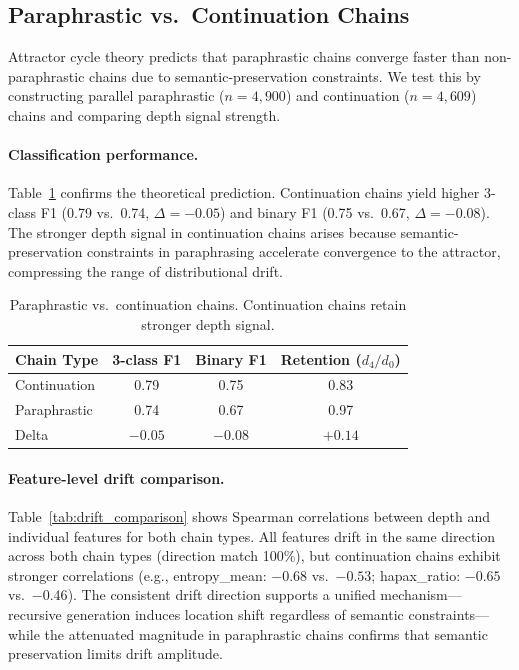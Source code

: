 \documentclass[11pt,a4paper]{article}
\begin{document}
\subsection{Paraphrastic vs.\ Continuation Chains}
\label{sec:para}

Attractor cycle theory predicts that paraphrastic chains converge faster than non-paraphrastic chains due to semantic-preservation constraints. We test this by constructing parallel paraphrastic ($n = 4{,}900$) and continuation ($n = 4{,}609$) chains and comparing depth signal strength.

\paragraph{Classification performance.} Table~\ref{tab:para_cont} confirms the theoretical prediction. Continuation chains yield higher 3-class F1 (0.79 vs.\ 0.74, $\Delta = -0.05$) and binary F1 (0.75 vs.\ 0.67, $\Delta = -0.08$). The stronger depth signal in continuation chains arises because semantic-preservation constraints in paraphrasing accelerate convergence to the attractor, compressing the range of distributional drift.

\begin{table}[t]
\centering
\caption{Paraphrastic vs.\ continuation chains. Continuation chains retain stronger depth signal.}
\label{tab:para_cont}
\begin{tabular}{lccc}
\toprule
Chain Type & 3-class F1 & Binary F1 & Retention ($d_4/d_0$) \\
\midrule
Continuation & 0.79 & 0.75 & 0.83 \\
Paraphrastic & 0.74 & 0.67 & 0.97 \\
\midrule
Delta & $-0.05$ & $-0.08$ & $+0.14$ \\
\bottomrule
\end{tabular}
\end{table}

\paragraph{Feature-level drift comparison.} Table~\ref{tab:drift_comparison} shows Spearman correlations between depth and individual features for both chain types. All features drift in the same direction across both chain types (direction match 100\%), but continuation chains exhibit stronger correlations (e.g., entropy\_mean: $-0.68$ vs.\ $-0.53$; hapax\_ratio: $-0.65$ vs.\ $-0.46$). The consistent drift direction supports a unified mechanism---recursive generation induces location shift regardless of semantic constraints---while the attenuated magnitude in paraphrastic chains confirms that semantic preservation limits drift amplitude.
\end{document}
